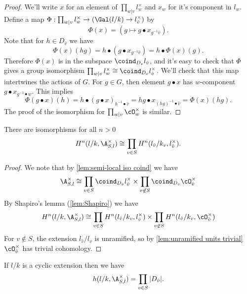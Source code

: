\begin{proof}
	We'll write $x$ for an element of $\prod_{w | v} l_w^\times$ and $x_w$ for it's component in $l_w$.
	Define a map $\Phi : \prod_{w | v} l_w^\times \to (\Gal(l/k) \to l_{\hat v}^\times)$ by
	\[
		\Phi (x)
		=
		(g \mapsto g \bullet x_{g^{-1} \hat v}).
	\]
	Note that for $h \in D_{\hat v}$ we have
	\[
		\Phi (x) (hg) = h \bullet (g \bullet x_{g^{-1} \hat v}) = h \bullet \Phi(x) (g).
	\]
	Therefore $\Phi(x)$ is in the subspace $\coind_{D_v} l_{\hat v}$, and it's
	easy to check that $\Phi$ gives a group isomorphism
	$\prod_{w | v} l_w^\times \cong \coind_{D_v} l_{\hat v}^\times$.
	We'll check that this map intertwines the actions of $G$.
	For $g \in G$, then element $g \bullet x$ has $w$-component
	$g \bullet x_{g^{-1}\bullet w}$.
	This implies
	\[
		\Phi( g \bullet x)(h)
		=	h\bullet (g \bullet x)_{h^{-1} \bullet \hat v}
		=	h g \bullet x_{(hg)^{-1} \bullet \hat v}
		= \Phi (x) (hg).
	\]
	The proof of the isomorphism for $\prod_{w | v} \cO_w^\times$ is similar.
\end{proof}

\begin{lemma} \label{lem:cohomology S-ideles decomp}
	There are isomorphisms for all $n > 0$
	\[
		H^n(l/k, \A_{S,l}^\times)
		\cong
		\prod_{v \in S} H^n(l_{\hat v} / k_v, l_{\hat v}^\times).
	\]
\end{lemma}

\begin{proof}
	We note that by \ref{lem:semi-local iso coind} we have
	\[
		\A_{S,l}^\times \cong \prod_{v \in S} \coind_{D_{\hat v}} l_{\hat v}^\times
		\times
		\prod_{v \not\in S} \coind_{D_{\hat v}} \cO_{\hat v}^\times
	\]
	By Shapiro's lemma (\ref{lem:Shapiro}) we have
	\[
		H^n(l/k,\A_{S,l}^\times) \cong
		\prod_{v \in S} H^n(l_{\hat v}/k_v , l_{\hat v}^\times)
		\times
		\prod_{v \not\in S} H^n(l_{\hat v}/k_v , \cO_{\hat v}^\times)
	\]
	For $v \not\in S$, the extension $l_{\hat{v}}/l_v$ is unramified, so
	by \ref{lem:unramified units trivial} $\cO_{\hat v}^\times$ has trivial cohomology.
\end{proof}


\begin{lemma} \label{lem:herbrand S-ideles}
	If $l/k$ is a cyclic extension then we have
	\[
		h(l/k, \A_{S,l} ^\times )
		=
		\prod_{v \in S} |D_{\hat v}|.
	\]
\end{lemma}

